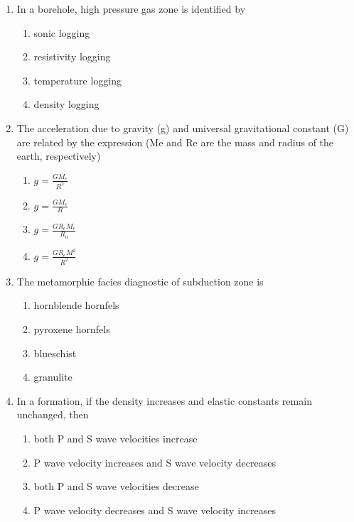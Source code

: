 \documentclass[journal,12pt,onecolumn]{IEEEtran}
\theoremstyle{remark}
\begin{document}
\begin{enumerate}
\item In a borehole, high pressure gas zone is identified by
\begin{multicols}{2}
\begin{enumerate}
\item sonic logging  
\item resistivity logging  
\item temperature logging  
\item density logging  
\end{enumerate}
\end{multicols}

\item The acceleration due to gravity (g) and universal gravitational constant (G) are related by the expression (Me and Re are the mass and radius of the earth, respectively)
\begin{multicols}{2}
\begin{enumerate}
\item \( g = \frac{GM_e}{R^2} \)  
\item \( g = \frac{GM_e}{R} \)  
\item \( g = \frac{G R_e M_e}{R_a} \)  
\item \( g = \frac{G R_e M^2}{R^2} \)  
\end{enumerate}
\end{multicols}

\item The metamorphic facies diagnostic of subduction zone is
\begin{multicols}{4}
\begin{enumerate}
\item hornblende hornfels  
\item pyroxene hornfels  
\item blueschist  
\item granulite  
\end{enumerate}
\end{multicols}

\item In a formation, if the density increases and elastic constants remain unchanged, then
\begin{enumerate}
\item both P and S wave velocities increase  
\item P wave velocity increases and S wave velocity decreases  
\item both P and S wave velocities decrease  
\item P wave velocity decreases and S wave velocity increases  
\end{enumerate}


\end{enumerate}
\end{document}
